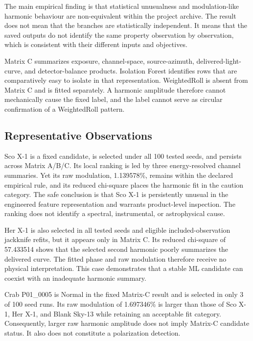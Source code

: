 \documentclass[conference]{IEEEtran}
\begin{document}
The main empirical finding is that statistical unusualness and modulation-like harmonic behaviour are non-equivalent within the project archive. The result does not mean that the branches are statistically independent. It means that the saved outputs do not identify the same property observation by observation, which is consistent with their different inputs and objectives.


Matrix C summarizes exposure, channel-space, source-azimuth, delivered-light-curve, and detector-balance products. Isolation Forest identifies rows that are comparatively easy to isolate in that representation. WeightedRoll is absent from Matrix C and is fitted separately. A harmonic amplitude therefore cannot mechanically cause the fixed label, and the label cannot serve as circular confirmation of a WeightedRoll pattern.


\subsection{Representative Observations}

Sco X-1 is a fixed candidate, is selected under all 100 tested seeds, and persists across Matrix A/B/C. Its local ranking is led by three energy-resolved channel summaries. Yet its raw modulation, 1.139578\%, remains within the declared empirical rule, and its reduced chi-square places the harmonic fit in the caution category. The safe conclusion is that Sco X-1 is persistently unusual in the engineered feature representation and warrants product-level inspection. The ranking does not identify a spectral, instrumental, or astrophysical cause.


Her X-1 is also selected in all tested seeds and eligible included-observation jackknife refits, but it appears only in Matrix C. Its reduced chi-square of 57.433514 shows that the selected second harmonic poorly summarizes the delivered curve. The fitted phase and raw modulation therefore receive no physical interpretation. This case demonstrates that a stable ML candidate can coexist with an inadequate harmonic summary.


Crab P01\_0005 is Normal in the fixed Matrix-C result and is selected in only 3 of 100 seed runs. Its raw modulation of 1.697346\% is larger than those of Sco X-1, Her X-1, and Blank Sky-13 while retaining an acceptable fit category. Consequently, larger raw harmonic amplitude does not imply Matrix-C candidate status. It also does not constitute a polarization detection.
\end{document}

